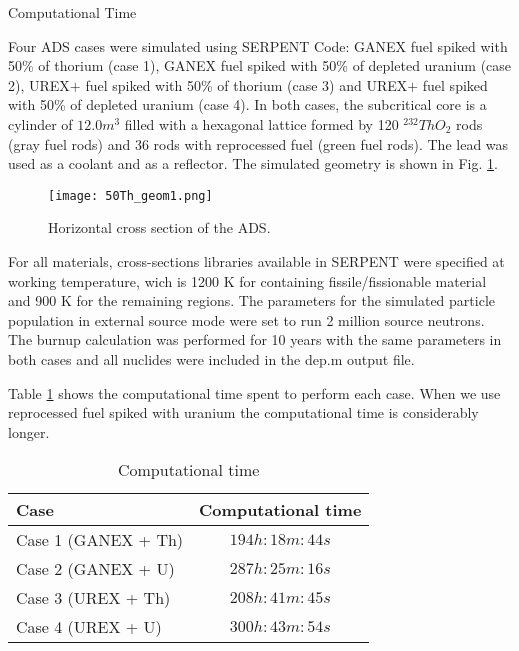 \documentclass{article}
\begin{document}
\newpage
\begin{section}{Computational Time}

Four ADS cases were simulated using SERPENT Code:  GANEX fuel spiked with 50\% of thorium (case 1), GANEX fuel spiked with 50\% of depleted uranium (case 2), UREX$+$ fuel spiked with 50\% of thorium (case 3) and UREX$+$ fuel spiked with 50\% of depleted uranium (case 4). In both cases, the subcritical core is a cylinder of $12.0m^3$ filled with a hexagonal lattice formed by 120 $^{232}ThO_2$ rods (gray fuel rods) and 36 rods with reprocessed fuel (green fuel rods). The lead was used as a coolant and as a reflector. The simulated geometry is shown in Fig. \ref{geo}.


\begin{figure}[htb!]
\centering
\texttt{[image: 50Th\_geom1.png]}
\caption{Horizontal cross section of the ADS.}
\label{geo}
\end{figure}

For all materials, cross-sections libraries available in SERPENT were specified at working temperature, wich is 1200 K for containing fissile/fissionable material and 900 K for the remaining regions. The parameters for the simulated particle population in external source mode were set to run 2 million source neutrons. The burnup calculation was performed for 10 years with the same parameters in both cases and all nuclides were included in the dep.m output file.  

Table \ref{time} shows the computational time spent to perform each case. When we use reprocessed fuel spiked with uranium the computational time is considerably longer.

\begin{table}[htb!]
\caption{Computational time}
\label{time}
\centering
\vspace{0.5cm}
\begin{tabular}{l|c}\hline   
Case & Computational time\\ \hline
Case 1 (GANEX + Th) & $194h:18m:44s$\\ \hline
Case 2 (GANEX + U) & $287h:25m:16s $\\ \hline
Case 3 (UREX + Th) & $208h:41m:45s $\\ \hline
Case 4 (UREX + U) & $300h:43m:54s $\\ \hline
\end{tabular}
\end{table}



\end{section}
\end{document}
